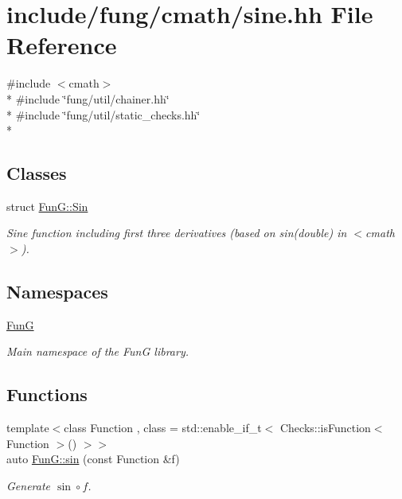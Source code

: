 \hypertarget{sine_8hh}{\section{include/fung/cmath/sine.hh File Reference}
\label{sine_8hh}
}
{\ttfamily \#include $<$cmath$>$}\\*
{\ttfamily \#include \char`\"{}fung/util/chainer.\-hh\char`\"{}}\\*
{\ttfamily \#include \char`\"{}fung/util/static\-\_\-checks.\-hh\char`\"{}}\\*
\subsection*{Classes}
\begin{DoxyCompactItemize}
\item 
struct \hyperlink{structFunG_1_1Sin}{Fun\-G\-::\-Sin}
\begin{DoxyCompactList}\small\item\em Sine function including first three derivatives (based on sin(double) in $<$cmath$>$). \end{DoxyCompactList}\end{DoxyCompactItemize}
\subsection*{Namespaces}
\begin{DoxyCompactItemize}
\item 
\hyperlink{namespaceFunG}{Fun\-G}
\begin{DoxyCompactList}\small\item\em Main namespace of the Fun\-G library. \end{DoxyCompactList}\end{DoxyCompactItemize}
\subsection*{Functions}
\begin{DoxyCompactItemize}
\item 
{\footnotesize template$<$class Function , class  = std\-::enable\-\_\-if\-\_\-t$<$ Checks\-::is\-Function$<$ Function $>$() $>$$>$ }\\auto \hyperlink{group__CMathGroup_ga663fdbe7a8977cba529c7c33981b7738}{Fun\-G\-::sin} (const Function \&f)
\begin{DoxyCompactList}\small\item\em Generate $ \sin\circ f $. \end{DoxyCompactList}\end{DoxyCompactItemize}
